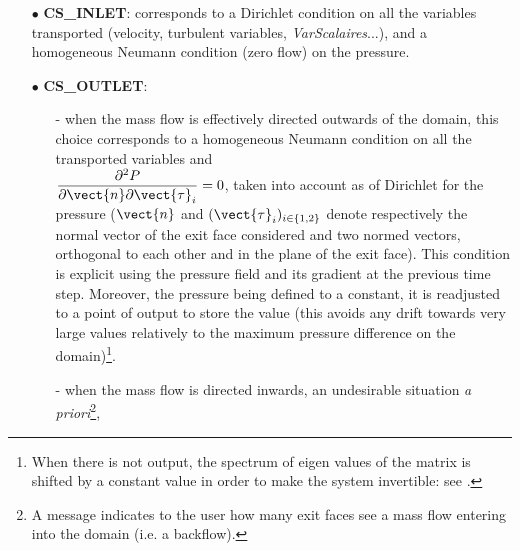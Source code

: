 \begin{itemize}
\item [$\bullet$] {\bf CS\_INLET}: corresponds to a Dirichlet condition on
all the variables transported (velocity, turbulent variables,
{\it VarScalaires}...), and
a homogeneous Neumann condition (zero flow) on the pressure.

\item [$\bullet$] {\bf CS\_OUTLET}:
        \begin{itemize}
        \item [-] when the mass flow is effectively directed outwards
of the domain, this choice corresponds to a homogeneous Neumann condition
on all the transported variables and\\
$\displaystyle\frac{\partial^2P}{\partial \vect{n}\partial\vect{\tau}_i}=0$, taken into account as
of Dirichlet for the pressure
($\vect{n}$ and $(\vect{\tau}_i)_{i \in \{1,2\}}$
denote respectively the normal vector of the exit face considered
and two normed vectors, orthogonal to each other and in the plane of the exit face).
This condition is explicit using the pressure field and its gradient
at the previous time step.
Moreover, the pressure being defined to a constant, it is readjusted to a point of
output to store the value  (this avoids any drift towards very large values
relatively to the maximum pressure difference on the domain)\footnote{When there is not output,
the spectrum of eigen values of the matrix is shifted by a constant value
in order to make the system invertible: see .}.
        \item [-] when the mass flow is directed inwards, an
undesirable situation {\it a priori}\footnote{A message indicates
to the user how many exit faces see a mass flow entering into the domain (i.e. a backflow).
},


\end{itemize}
\end{itemize}
